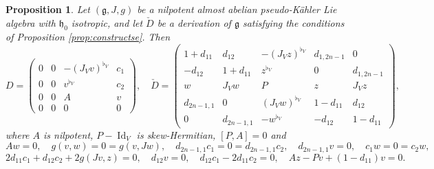 \documentclass{article}
\newtheorem{proposition}[theorem]{Proposition}
\theoremstyle{definition}
\DeclareMathOperator{\Id}{Id}
\newcommand{\frg}{\mathfrak{g}}
\newcommand{\frh}{\mathfrak{h}}
\begin{document}
\begin{proposition}\label{prop:ESnil}
    Let $(\frg,J,g)$ be a nilpotent almost abelian pseudo-Kähler Lie algebra with $\frh_0$ isotropic, and let $\check D$ be a derivation of $\frg$ satisfying the conditions of Proposition \ref{prop:constructse}. Then \begin{equation}\label{eq:D_and_check_D}
        D=\begin{pmatrix}
        0&0&-(J_Vv)^{\flat_V}&c_1\\
        0&0&v^{\flat_V}&c_2\\
        0&0&A&v\\
        0&0&0&0
    \end{pmatrix},\quad\check{D}=\begin{pmatrix}
        1+d_{11} & d_{12} & -(J_Vz)^{\flat_V} & d_{1,2n-1} & 0\\
        -d_{12} &1+ d_{11} & z^{\flat_V} &0 & d_{1,2n-1}\\
        w & J_Vw & P & z & J_Vz\\
        d_{2n-1,1} & 0 & (J_Vw)^{\flat_V} & 1-d_{11} & d_{12}\\
        0 & d_{2n-1,1} &- w^{\flat_V} & -d_{12} & 1-d_{11}
    \end{pmatrix},\end{equation} where $A$ is nilpotent, $P-\Id_V$ is skew-Hermitian, $[P,A]=0$ and $$Aw=0, \quad g(v,w)=0=g(v,Jw), \quad d_{2n-1,1}c_1=0=d_{2n-1,1}c_2, \quad d_{2n-1,1}v=0, \quad c_1w=0=c_2w,$$
    $$2d_{11}c_1 + d_{12}c_2 +2g(Jv,z)=0, \quad d_{12}v=0, \quad d_{12}c_1-2d_{11}c_2=0, \quad Az-Pv+(1-d_{11})v=0.$$
\end{proposition}
\end{document}
